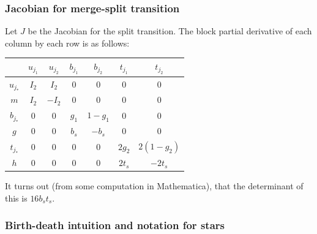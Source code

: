 \documentclass[11pt]{article}
\begin{document}
\subsubsection{Jacobian for merge-split transition}

Let $J$ be the Jacobian for the split transition. The block partial
derivative of each column by each row is as follows:


\begin{center}
\begin{tabular}{|c||c|c|c|c|c|c|}
\cline{2-7} 
\multicolumn{1}{c|}{} & $u_{j_{1}}$ & $u_{j_{2}}$ & $b_{j_{1}}$ & $b_{j_{2}}$ & $t_{j_1}$ & $t_{j_2}$\tabularnewline
\hline 
$u_{j_{*}}$ & $I_2$ & $I_2$ & $0$ & $0$ & 0 & 0\tabularnewline
\hline 
$m$ & $I_2$ & $-I_2$ & $0$ & $0$ & 0 & 0\tabularnewline
\hline 
$b_{j_{*}}$ & $0$ & $0$ & $g_1$ & $1-g_1$ & $0$ & $0$\tabularnewline
\hline 
$g$ & $0$ & $0$ & $b_s$ & $-b_s$ & $0$ & $0$ \tabularnewline
\hline
$t_{j_{*}}$ & $0$ & $0$ & $0$ & $0$ & $2g_2$ & $2 (1-g_2)$\tabularnewline
\hline
$h$ & $0$ & $0$ & $0$ & $0$ &$2t_s$ & $-2t_s$\tabularnewline
\hline
\end{tabular}
\par\end{center}

It turns out (from some computation in Mathematica), that the determinant of this is $16b_s t_s$.

\subsubsection{Birth-death intuition and notation for stars}
\end{document}
